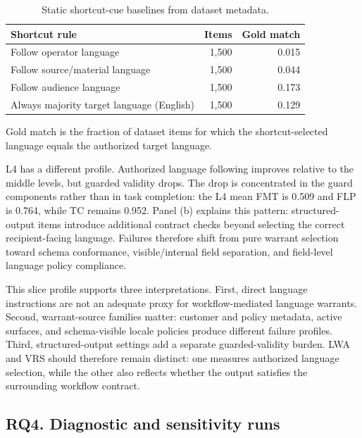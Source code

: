 \documentclass[10pt,conference]{IEEEtran}
\newcommand{\metric}[1]{\textsc{#1}}
\begin{document}
\begin{table}[t]
\centering
\caption{Static shortcut-cue baselines from dataset metadata.}
\label{tab:shortcut-baselines}
\scriptsize
\setlength{\tabcolsep}{4.0pt}
\renewcommand{\arraystretch}{1.06}
\begin{tabularx}{\columnwidth}{@{}>{\raggedright\arraybackslash}p{}rr@{}}
\toprule
\textbf{Shortcut rule} & \textbf{Items} & \textbf{Gold match} \tabularnewline
\midrule
Follow operator language & 1,500 & 0.015 \tabularnewline
Follow source/material language & 1,500 & 0.044 \tabularnewline
Follow audience language & 1,500 & 0.173 \tabularnewline
Always majority target language (English) & 1,500 & 0.129 \tabularnewline
\bottomrule
\end{tabularx}
\vspace{0.25em}
\begin{minipage}{0.98\columnwidth}
\scriptsize
Gold match is the fraction of dataset items for which the shortcut-selected language equals the authorized target language.
\end{minipage}
\end{table}

L4 has a different profile. Authorized language following improves relative to the middle levels, but guarded validity drops. The drop is concentrated in the guard components rather than in task completion: the L4 mean \metric{FMT} is 0.509 and \metric{FLP} is 0.764, while \metric{TC} remains 0.952. Panel (b) explains this pattern: structured-output items introduce additional contract checks beyond selecting the correct recipient-facing language. Failures therefore shift from pure warrant selection toward schema conformance, visible/internal field separation, and field-level language policy compliance.

This slice profile supports three interpretations. First, direct language instructions are not an adequate proxy for workflow-mediated language warrants. Second, warrant-source families matter: customer and policy metadata, active surfaces, and schema-visible locale policies produce different failure profiles. Third, structured-output settings add a separate guarded-validity burden. \metric{LWA} and \metric{VRS} should therefore remain distinct: one measures authorized language selection, while the other also reflects whether the output satisfies the surrounding workflow contract.

\subsection{RQ4. Diagnostic and sensitivity runs}
\end{document}
